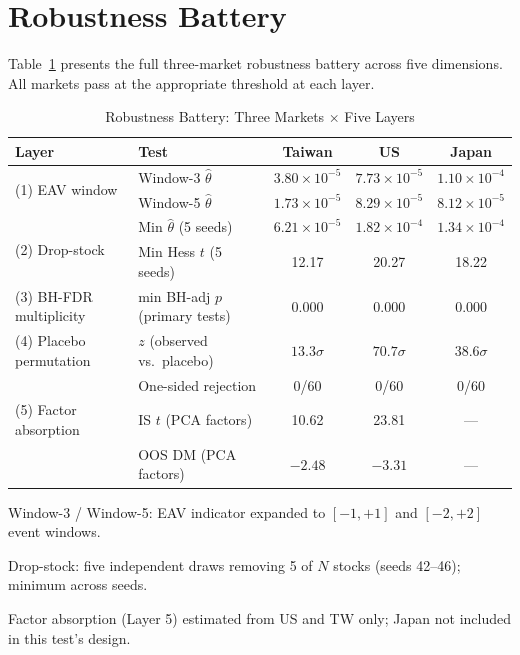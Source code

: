 \documentclass[12pt,a4paper]{article}
\begin{document}
\section{Robustness Battery}
\label{sec:robustness}

Table~\ref{tab:robustness} presents the full three-market robustness
battery across five dimensions. All markets pass at the appropriate
threshold at each layer.

\begin{table}[htbp]
\caption{Robustness Battery: Three Markets $\times$ Five Layers}
\label{tab:robustness}
\centering
\begin{threeparttable}
\begin{tabular}{llccc}
\toprule
Layer & Test & Taiwan & US & Japan \\
\midrule
\multirow{2}{*}{(1) EAV window}
  & Window-3 $\hat{\theta}$ & $3.80\times10^{-5}$ & $7.73\times10^{-5}$ & $1.10\times10^{-4}$ \\
  & Window-5 $\hat{\theta}$ & $1.73\times10^{-5}$ & $8.29\times10^{-5}$ & $8.12\times10^{-5}$ \\
\midrule
\multirow{2}{*}{(2) Drop-stock}
  & Min $\hat{\theta}$ (5 seeds) & $6.21\times10^{-5}$ & $1.82\times10^{-4}$ & $1.34\times10^{-4}$ \\
  & Min Hess $t$ (5 seeds) & 12.17 & 20.27 & 18.22 \\
\midrule
(3) BH-FDR multiplicity
  & min BH-adj $p$ (primary tests) & 0.000 & 0.000 & 0.000 \\
\midrule
(4) Placebo permutation
  & $z$ (observed vs.\ placebo) & $13.3\sigma$ & $70.7\sigma$ & $38.6\sigma$ \\
  & One-sided rejection & 0/60 & 0/60 & 0/60 \\
\midrule
(5) Factor absorption
  & IS $t$ (PCA factors) & 10.62 & 23.81 & --- \\
  & OOS DM (PCA factors) & $-2.48$ & $-3.31$ & --- \\
\bottomrule
\end{tabular}
\begin{tablenotes}
\small
\item[a] Window-3 / Window-5: EAV indicator expanded to $[-1,+1]$ and
  $[-2,+2]$ event windows.
\item[b] Drop-stock: five independent draws removing 5 of $N$ stocks
  (seeds 42--46); minimum across seeds.
\item[c] Factor absorption (Layer 5) estimated from US and TW only;
  Japan not included in this test's design.
\end{tablenotes}
\end{threeparttable}
\end{table}
\end{document}
